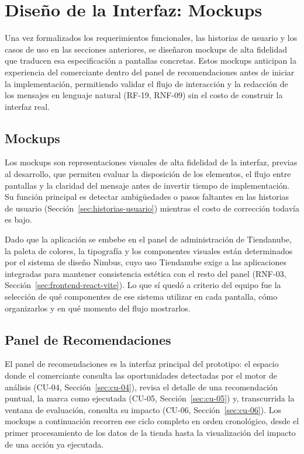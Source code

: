 \section{Diseño de la Interfaz: Mockups}
\label{sec:diseno-interfaz-mockups}

Una vez formalizados los requerimientos funcionales, las historias de usuario y los casos de uso en las secciones anteriores, se diseñaron mockups de alta fidelidad que traducen esa especificación a pantallas concretas. Estos mockups anticipan la experiencia del comerciante dentro del panel de recomendaciones antes de iniciar la implementación, permitiendo validar el flujo de interacción y la redacción de los mensajes en lenguaje natural (RF-19, RNF-09) sin el costo de construir la interfaz real.

\subsection{Mockups}
\label{sec:mockups}

Los mockups son representaciones visuales de alta fidelidad de la interfaz, previas al desarrollo, que permiten evaluar la disposición de los elementos, el flujo entre pantallas y la claridad del mensaje antes de invertir tiempo de implementación. Su función principal es detectar ambigüedades o pasos faltantes en las historias de usuario (Sección~\ref{sec:historias-usuario}) mientras el costo de corrección todavía es bajo.

Dado que la aplicación se embebe en el panel de administración de Tiendanube, la paleta de colores, la tipografía y los componentes visuales están determinados por el sistema de diseño Nimbus, cuyo uso Tiendanube exige a las aplicaciones integradas para mantener consistencia estética con el resto del panel (RNF-03, Sección~\ref{sec:frontend-react-vite}). Lo que sí quedó a criterio del equipo fue la selección de qué componentes de ese sistema utilizar en cada pantalla, cómo organizarlos y en qué momento del flujo mostrarlos.

\subsection{Panel de Recomendaciones}
\label{sec:mockup-panel-recomendaciones}

El panel de recomendaciones es la interfaz principal del prototipo: el espacio donde el comerciante consulta las oportunidades detectadas por el motor de análisis (CU-04, Sección~\ref{sec:cu-04}), revisa el detalle de una recomendación puntual, la marca como ejecutada (CU-05, Sección~\ref{sec:cu-05}) y, transcurrida la ventana de evaluación, consulta su impacto (CU-06, Sección~\ref{sec:cu-06}). Los mockups a continuación recorren ese ciclo completo en orden cronológico, desde el primer procesamiento de los datos de la tienda hasta la visualización del impacto de una acción ya ejecutada.

